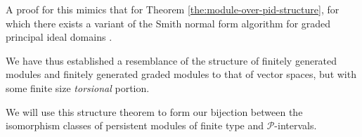 A proof for this mimics that for Theorem \ref{the:module-over-pid-structure}, for which there exists a variant of the Smith normal form algorithm for graded principal ideal domains \cite{skraba2013persistence}.

We have thus established a resemblance of the structure of finitely generated modules and finitely generated graded modules to that of vector spaces, but with some finite size \emph{torsional} portion.

We will use this structure theorem to form our bijection between the isomorphism classes of persistent modules of finite type and $\mathcal P$-intervals. 
